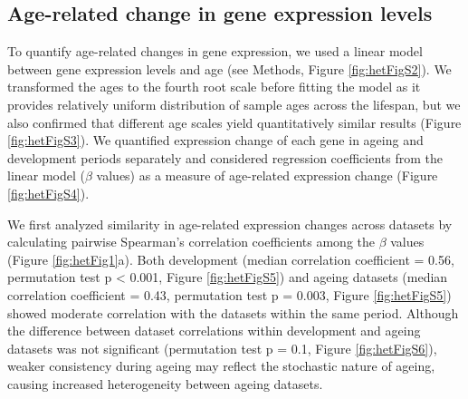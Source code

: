 \documentclass[12pt,twoside]{unicam}
\begin{document}
\hypertarget{age-related-change-in-gene-expression-levels}{%
\subsection{Age-related change in gene expression levels}\label{age-related-change-in-gene-expression-levels}}

To quantify age-related changes in gene expression, we used a linear model between gene expression levels and age (see Methods, Figure \ref{fig:hetFigS2}). We transformed the ages to the fourth root scale before fitting the model as it provides relatively uniform distribution of sample ages across the lifespan, but we also confirmed that different age scales yield quantitatively similar results (Figure \ref{fig:hetFigS3}). We quantified expression change of each gene in ageing and development periods separately and considered regression coefficients from the linear model (\(\beta\) values) as a measure of age-related expression change (Figure \ref{fig:hetFigS4}).

We first analyzed similarity in age-related expression changes across datasets by calculating pairwise Spearman's correlation coefficients among the \(\beta\) values (Figure \ref{fig:hetFig1}a). Both development (median correlation coefficient = 0.56, permutation test p \textless{} 0.001, Figure \ref{fig:hetFigS5}) and ageing datasets (median correlation coefficient = 0.43, permutation test p = 0.003, Figure \ref{fig:hetFigS5}) showed moderate correlation with the datasets within the same period. Although the difference between dataset correlations within development and ageing datasets was not significant (permutation test p = 0.1, Figure \ref{fig:hetFigS6}), weaker consistency during ageing may reflect the stochastic nature of ageing, causing increased heterogeneity between ageing datasets.
\end{document}
